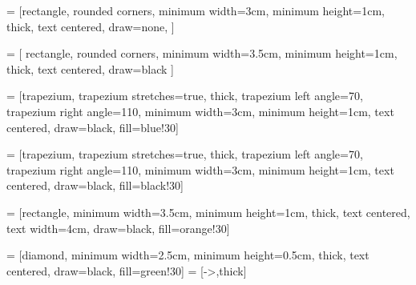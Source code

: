 \usetikzlibrary{automata, positioning, arrows}

\newcommand{\nobarfrac}{\genfrac{}{}{0pt}{}}

\newcommand{\bs}{\blacksquare}
\newcommand{\ws}{\square}

\usepackage{multicol}
\usetikzlibrary{shapes.geometric, arrows}

 = [rectangle, rounded corners,
minimum width=3cm,
minimum height=1cm,
thick,
text centered,
draw=none,
]

 = [
rectangle,
rounded corners,
minimum width=3.5cm,
minimum height=1cm,
thick,
text centered,
draw=black
]

 = [trapezium,
trapezium stretches=true, %
thick,
trapezium left angle=70,
trapezium right angle=110,
minimum width=3cm,
minimum height=1cm, text centered,
draw=black, fill=blue!30]

 = [trapezium,
trapezium stretches=true, %
thick,
trapezium left angle=70,
trapezium right angle=110,
minimum width=3cm,
minimum height=1cm, text centered,
draw=black, fill=black!30]

 = [rectangle,
minimum width=3.5cm,
minimum height=1cm,
thick,
text centered,
text width=4cm,
draw=black,
fill=orange!30]

 = [diamond,
minimum width=2.5cm,
minimum height=0.5cm,
thick,
text centered,
draw=black,
fill=green!30]
 = [->,thick]


\usepackage{sankey}

\newcommand\source[1]{%
    \tikz[remember picture,baseline,inner sep=0pt] {%
        \node [name=source,anchor=base]{$#1$};
    }%
    \setcounter{target}{0}
}

\newcommand\target[1]{%
    \tikz[remember picture,baseline,inner sep=0pt] {%
        \node [name=target-\thetarget,anchor=base]{$#1$};
    }%
    \stepcounter{target}%
}

\newcommand\drawarrows{
    \tikz[remember picture, overlay, bend left=20, -latex] {
        \foreach \i [evaluate=\i as \n using int(\i-1)] in {1,...,\thetarget} {
            \draw (source.north) to (target-\n.north);
        }
    }
}

\makeatletter
\newcommand{\leftharpoonrightarrow}{%
  \mathrel{\mathpalette\leftharpoonrightarrow@{}}%
}
\newcommand{\leftharpoonrightarrow@}[2]{%
  \sbox\z@{$\m@th#1\leftrightarrow$}%
  \hbox to \wd\z@{%
    \rlap{$\m@th#1\mkern-2mu\leftharpoonup$}%
    \hfil
    $\m@th#1\mkern 2mu\rightarrow$%
  }%
}
\makeatother
